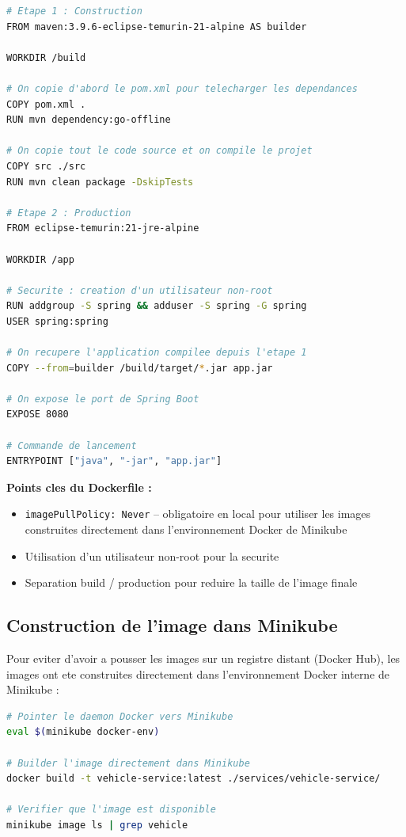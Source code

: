 \documentclass[12pt,a4paper]{article}
\begin{document}
\begin{lstlisting}[language=bash, caption=Dockerfile multi-stage – vehicle-service (Spring Boot)]
# Etape 1 : Construction
FROM maven:3.9.6-eclipse-temurin-21-alpine AS builder

WORKDIR /build

# On copie d'abord le pom.xml pour telecharger les dependances
COPY pom.xml .
RUN mvn dependency:go-offline

# On copie tout le code source et on compile le projet
COPY src ./src
RUN mvn clean package -DskipTests

# Etape 2 : Production
FROM eclipse-temurin:21-jre-alpine

WORKDIR /app

# Securite : creation d'un utilisateur non-root
RUN addgroup -S spring && adduser -S spring -G spring
USER spring:spring

# On recupere l'application compilee depuis l'etape 1
COPY --from=builder /build/target/*.jar app.jar

# On expose le port de Spring Boot
EXPOSE 8080

# Commande de lancement
ENTRYPOINT ["java", "-jar", "app.jar"]
\end{lstlisting}

\textbf{Points cles du Dockerfile :}
\begin{itemize}
  \item \texttt{imagePullPolicy: Never} -- obligatoire en local pour utiliser les images
        construites directement dans l'environnement Docker de Minikube
  \item Utilisation d'un utilisateur non-root pour la securite
  \item Separation build / production pour reduire la taille de l'image finale
\end{itemize}

\subsection{Construction de l'image dans Minikube}

Pour eviter d'avoir a pousser les images sur un registre distant (Docker Hub), les images
ont ete construites directement dans l'environnement Docker interne de Minikube :

\begin{lstlisting}[language=bash, caption=Construction de l'image dans Minikube]
# Pointer le daemon Docker vers Minikube
eval $(minikube docker-env)

# Builder l'image directement dans Minikube
docker build -t vehicle-service:latest ./services/vehicle-service/

# Verifier que l'image est disponible
minikube image ls | grep vehicle
\end{lstlisting}
\end{document}
